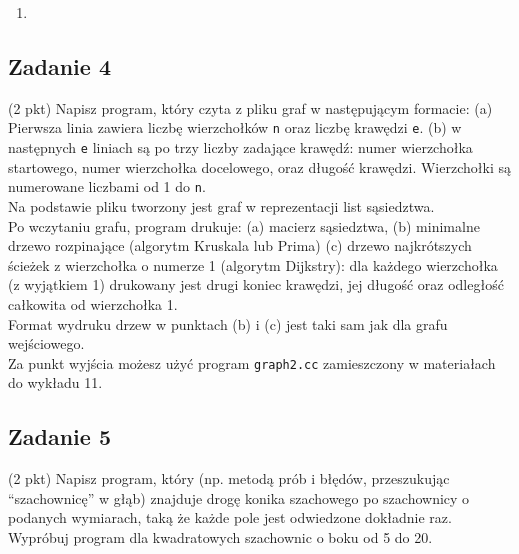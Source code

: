 \documentclass{article}
\begin{document}
\begin{enumerate}[label=(\alph*)]
    \item
          \begin{center}
          \end{center}
\end{enumerate}

\subsection*{Zadanie 4}
(2 pkt) Napisz program, który czyta z pliku graf w następującym formacie:
(a) Pierwsza linia zawiera liczbę wierzchołków \verb|n| oraz liczbę krawędzi \verb|e|.
(b) w następnych \verb|e| liniach są po trzy liczby zadające krawędź: numer wierzchołka
startowego, numer wierzchołka docelowego, oraz długość krawędzi. Wierzchołki są numerowane liczbami od 1 do \verb|n|. \\[1em]
Na podstawie pliku tworzony jest graf w reprezentacji list sąsiedztwa. \\[1em]
Po wczytaniu grafu, program drukuje:
(a) macierz sąsiedztwa,
(b) minimalne drzewo rozpinające (algorytm Kruskala lub Prima)
(c) drzewo najkrótszych ścieżek z wierzchołka o numerze 1 (algorytm Dijkstry): dla
każdego wierzchołka (z wyjątkiem 1) drukowany jest drugi koniec krawędzi, jej długość
oraz odległość całkowita od wierzchołka 1. \\[1em]
Format wydruku drzew w punktach (b) i (c) jest taki sam jak dla grafu wejściowego. \\[1em]
Za punkt wyjścia możesz użyć program \verb|graph2.cc| zamieszczony w materiałach do wykładu 11.

\subsection*{Zadanie 5}
(2 pkt) Napisz program, który (np. metodą prób i błędów, przeszukując “szachownicę” w
głąb) znajduje drogę konika szachowego po szachownicy o podanych wymiarach, taką
że każde pole jest odwiedzone dokładnie raz. Wypróbuj program dla kwadratowych szachownic o boku od 5 do 20.
\end{document}
